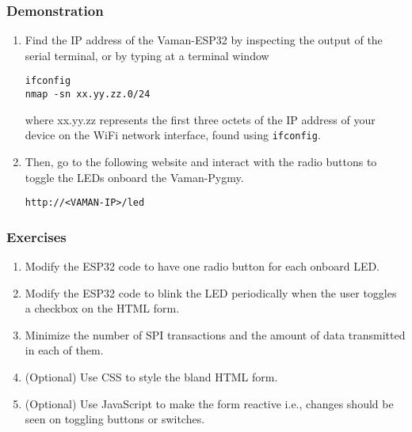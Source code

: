 \subsubsection{Demonstration}
\begin{enumerate}
    \item Find the IP address of the Vaman-ESP32 by inspecting the output of the
    serial terminal, or by typing at a terminal window
    \begin{lstlisting}
ifconfig
nmap -sn xx.yy.zz.0/24
    \end{lstlisting}
    where xx.yy.zz represents the first three octets of the IP address of your
    device on the WiFi network interface, found using \texttt{ifconfig}.
    \item Then, go to the following website and interact with the radio buttons
    to toggle the LEDs onboard the Vaman-Pygmy. 
    \begin{lstlisting}
http://<VAMAN-IP>/led
    \end{lstlisting}
\end{enumerate}

\subsubsection{Exercises}
\begin{enumerate}
    \item Modify the ESP32 code to have one radio button for each onboard LED.
    \item Modify the ESP32 code to blink the LED periodically when the user
    toggles a checkbox on the HTML form.
    \item Minimize the number of SPI transactions and the amount of data
    transmitted in each of them.
    \item (Optional) Use CSS to style the bland HTML form.
    \item (Optional) Use JavaScript to make the form reactive i.e., changes
    should be seen on toggling buttons or switches.
\end{enumerate}